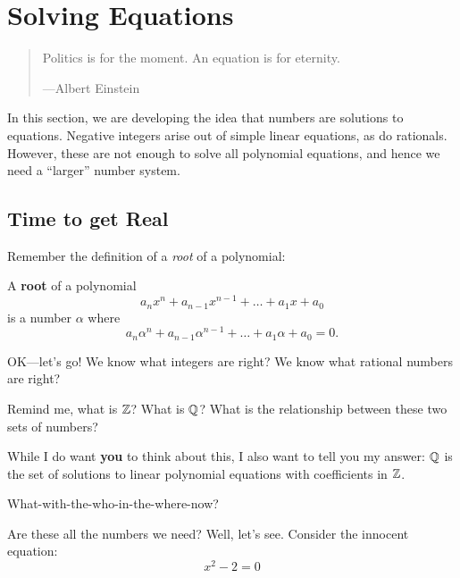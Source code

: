 \chapter{Solving Equations}


\begin{quote}

Politics is for the moment. An equation is for eternity.

\hfill---Albert Einstein
\end{quote}


\begin{teachingnote}
In this section, we are developing the idea that numbers are solutions
to equations. Negative integers arise out of simple linear equations,
as do rationals. However, these are not enough to solve all polynomial
equations, and hence we need a ``larger'' number system.
\end{teachingnote}


\section{Time to get Real}

Remember the definition of a \textit{root} of a polynomial:

\begin{definition} A \textbf{root} of a polynomial 
\[
a_nx^n + a_{n-1}x^{n-1} + \dots + a_1 x + a_0
\]
is a number $\alpha$ where
\[
a_n\alpha^n + a_{n-1}\alpha^{n-1} + \dots + a_1 \alpha + a_0 = 0.
\]
\end{definition}


OK---let's go! We know what integers are right? We know what rational
numbers are right?

\begin{question}
Remind me, what is $\mathbb Z$? What is $\mathbb Q$? What is the relationship between
these two sets of numbers?
\end{question}
While I do want \textbf{you} to think about this, I also want to tell
you my answer: $\mathbb Q$ is the set of solutions to linear polynomial
equations with coefficients in $\mathbb Z$.

\begin{question}
What-with-the-who-in-the-where-now?
\end{question}
\QM

Are these all the numbers we need? Well, let's see. Consider the
innocent equation:
\[
x^2 -2 = 0
\]

